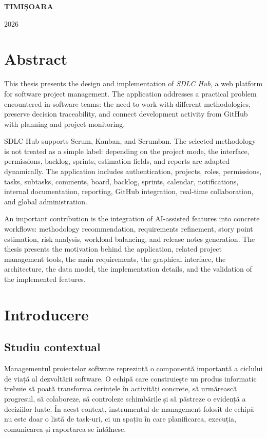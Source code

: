 \documentclass[12pt,a4paper]{report}
\begin{document}
\begin{center}
	{\bf TIMIȘOARA

		2026}
\end{center}

\newpage\normalsize{}

\clearpage
\thispagestyle{plain}


\cleardoublepage


\cleardoublepage\chapter*{Abstract}
\thispagestyle{plain}

This thesis presents the design and implementation of \textit{SDLC Hub}, a web platform for software project management. The application addresses a practical problem encountered in software teams: the need to work with different methodologies, preserve decision traceability, and connect development activity from GitHub with planning and project monitoring.

SDLC Hub supports Scrum, Kanban, and Scrumban. The selected methodology is not treated as a simple label: depending on the project mode, the interface, permissions, backlog, sprints, estimation fields, and reports are adapted dynamically. The application includes authentication, projects, roles, permissions, tasks, subtasks, comments, board, backlog, sprints, calendar, notifications, internal documentation, reporting, GitHub integration, real-time collaboration, and global administration.

An important contribution is the integration of AI-assisted features into concrete workflows: methodology recommendation, requirements refinement, story point estimation, risk analysis, workload balancing, and release notes generation. The thesis presents the motivation behind the application, related project management tools, the main requirements, the graphical interface, the architecture, the data model, the implementation details, and the validation of the implemented features.

\cleardoublepage\setcounter{tocdepth}{2}\setcounter{secnumdepth}{3}
\tableofcontents
\cleardoublepage
\listoffigures

\cleardoublepage


\chapter{Introducere}
\label{chap:introducere}

\section{Studiu contextual}
Managementul proiectelor software reprezintă o componentă importantă a ciclului de viață al dezvoltării software. O echipă care construiește un produs informatic trebuie să poată transforma cerințele în activități concrete, să urmărească progresul, să colaboreze, să controleze schimbările și să păstreze o evidență a deciziilor luate. În acest context, instrumentul de management folosit de echipă nu este doar o listă de task-uri, ci un spațiu în care planificarea, execuția, comunicarea și raportarea se întâlnesc.
\end{document}
